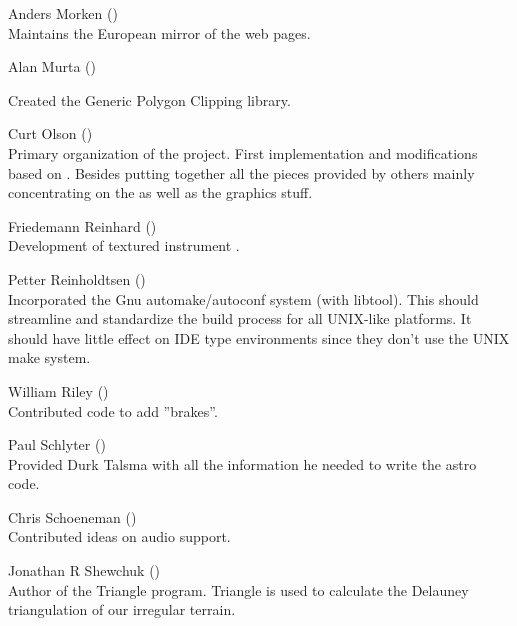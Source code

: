 \noindent Anders Morken ()\\
  Maintains the European mirror of the \FlightGear web pages.
 \medskip

\noindent Alan Murta ()


  \noindent
  Created the Generic Polygon Clipping library.
 \medskip

\noindent Curt Olson ()\\
 Primary organization of the project. First implementation
 and modifications based on . Besides putting together all
 the pieces provided by others mainly concentrating on the  as well as the graphics stuff.
 \medskip

\noindent Friedemann Reinhard
()\\
  Development of textured instrument .
 \medskip

\noindent Petter Reinholdtsen ()\\
  Incorporated the Gnu automake/autoconf system (with libtool).
  This should streamline and standardize the build process for all
  UNIX-like platforms.  It should have little effect on IDE type
  environments since they don't use the UNIX make system.
 \medskip

\noindent William Riley ()\\
  Contributed code to add ''brakes''.
 \medskip

\noindent Paul Schlyter ()\\
  Provided Durk Talsma with all the information he needed to write the astro code.
 \medskip

\noindent Chris Schoeneman ()\\
  Contributed ideas on audio support.
 \medskip

\noindent Jonathan R Shewchuk
()\\
  Author of the Triangle program.  Triangle
  is used to calculate the  Delauney triangulation of our irregular terrain.
 \medskip

